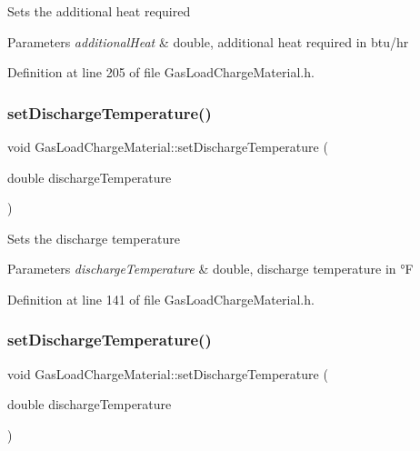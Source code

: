 Sets the additional heat required 
\begin{DoxyParams}{Parameters}
{\em additional\+Heat} & double, additional heat required in btu/hr \\
\hline
\end{DoxyParams}


Definition at line 205 of file Gas\+Load\+Charge\+Material.\+h.

\mbox{\label{class_gas_load_charge_material_a6c53344d5370a1e9b7321a530a6843c0}} 
\subsubsection{\texorpdfstring{set\+Discharge\+Temperature()}{setDischargeTemperature()}\hspace{0.1cm}{\footnotesize\ttfamily [1/3]}}
{\footnotesize\ttfamily void Gas\+Load\+Charge\+Material\+::set\+Discharge\+Temperature (\begin{DoxyParamCaption}\item[{double}]{discharge\+Temperature }\end{DoxyParamCaption})\hspace{0.3cm}{\ttfamily [inline]}}

Sets the discharge temperature 
\begin{DoxyParams}{Parameters}
{\em discharge\+Temperature} & double, discharge temperature in °F \\
\hline
\end{DoxyParams}


Definition at line 141 of file Gas\+Load\+Charge\+Material.\+h.

\mbox{\label{class_gas_load_charge_material_a6c53344d5370a1e9b7321a530a6843c0}} 
\subsubsection{\texorpdfstring{set\+Discharge\+Temperature()}{setDischargeTemperature()}\hspace{0.1cm}{\footnotesize\ttfamily [2/3]}}
{\footnotesize\ttfamily void Gas\+Load\+Charge\+Material\+::set\+Discharge\+Temperature (\begin{DoxyParamCaption}\item[{double}]{discharge\+Temperature }\end{DoxyParamCaption})\hspace{0.3cm}{\ttfamily [inline]}}


